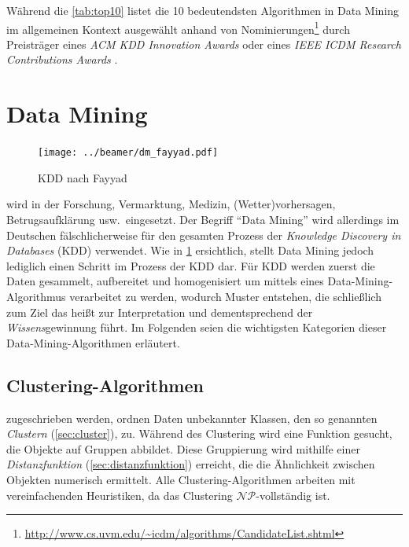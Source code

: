 \documentclass[12pt,journal,compsoc,ngerman]{IEEEtran}
\begin{document}
Während die %
\cref{tab:top10} listet die 10 bedeutendsten Algorithmen in Data Mining im allgemeinen Kontext ausgewählt anhand von Nominierungen\footnote{\url{http://www.cs.uvm.edu/~icdm/algorithms/CandidateList.shtml}} durch Preisträger eines \emph{ACM KDD Innovation Awards} oder eines \emph{IEEE ICDM Research Contributions Awards} \cite{wu2008top}.


\section{Data Mining}

\begin{figure}[!b]
  \centering
  \texttt{[image: ../beamer/dm\_fayyad.pdf]}
  \caption{KDD nach Fayyad \cite{fayyad1996data}}
  \label{fig:kdd}
\end{figure}
  
 wird in der Forschung, Vermarktung, Medizin, (Wetter)vorhersagen, Betrugsaufklärung usw.~eingesetzt. Der Begriff \enquote{Data Mining} wird allerdings im Deutschen fälschlicherweise für den gesamten Prozess der \emph{Knowledge Discovery in Databases} (KDD) verwendet. Wie in \cref{fig:kdd} ersichtlich, stellt Data Mining jedoch lediglich einen Schritt im Prozess der KDD dar. Für KDD werden zuerst die Daten gesammelt, aufbereitet und homogenisiert um mittels eines Data-Mining-Algorithmus verarbeitet zu werden, wodurch Muster entstehen, die schließlich zum Ziel das heißt zur Interpretation und dementsprechend der \emph{Wissens}gewinnung führt. Im Folgenden seien die wichtigsten Kategorien dieser Data-Mining-Algorithmen erläutert.

 
\subsection{Clustering-Algorithmen}

 zugeschrieben werden, ordnen Daten unbekannter Klassen, den so genannten \emph{Clustern} (\cref{sec:cluster}), zu. Während des Clustering wird eine Funktion gesucht, die Objekte auf Gruppen abbildet. Diese Gruppierung wird mithilfe
einer \emph{Distanzfunktion} (\cref{sec:distanzfunktion}) erreicht, die die Ähnlichkeit zwischen Objekten numerisch ermittelt.
Alle Clustering-Algorithmen arbeiten mit vereinfachenden Heuristiken, da das Clustering $\mathcal{NP}$-vollständig ist. %
\end{document}
